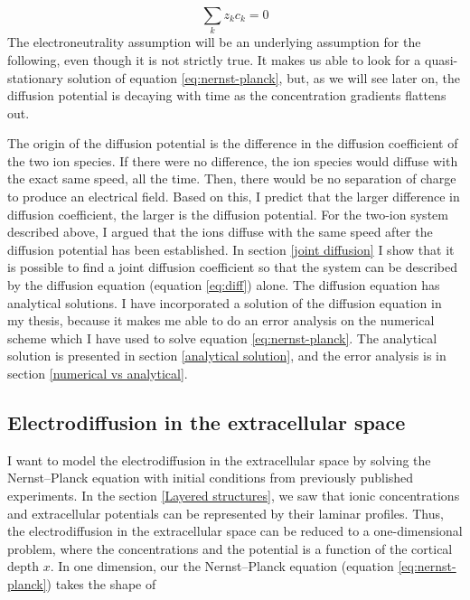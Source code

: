\documentclass{article}
\begin{document}
$$\sum _k z_k c_k =0$$
The electroneutrality assumption will be an underlying assumption for the following, even though it is not strictly true. It makes us able to look for a quasi-stationary solution of equation \ref{eq:nernst-planck}, but, as we will see later on, the diffusion potential is decaying with time as the concentration gradients flattens out. 



The origin of the diffusion potential is the difference in the diffusion coefficient of the two ion species. If there were no difference, the ion species would diffuse with the exact same speed, all the time. Then, there would be no separation of charge to produce an electrical field. Based on this, I predict that the larger difference in diffusion coefficient, the larger is the diffusion potential. For the two-ion system described above, I argued that the ions diffuse with the same speed after the diffusion potential has been established. In section \ref{joint diffusion} I show that  it is possible to find a joint diffusion coefficient so that the system can be described by the diffusion equation (equation  \ref{eq:diff}) alone. The diffusion equation has analytical solutions. I have incorporated a solution of the diffusion equation in my thesis, because it makes me able to do an error analysis on the numerical scheme which I have used to solve   equation \ref{eq:nernst-planck}. The analytical solution is presented in section \ref{analytical solution}, and the error analysis is in section \ref{numerical vs analytical}.

\subsection{Electrodiffusion in the extracellular space}\label{el.diff in ES}
I want to model the electrodiffusion in the extracellular space by solving the Nernst--Planck equation with initial conditions from previously published experiments. In the section \ref{Layered structures}, we saw that ionic concentrations and extracellular potentials can be represented by their laminar profiles. Thus, the electrodiffusion in the extracellular space can be reduced to a one-dimensional problem, where the concentrations and the potential is a function of the cortical depth $x$. In one dimension, our the Nernst--Planck equation (equation \ref{eq:nernst-planck}) takes the shape of 
\end{document}
